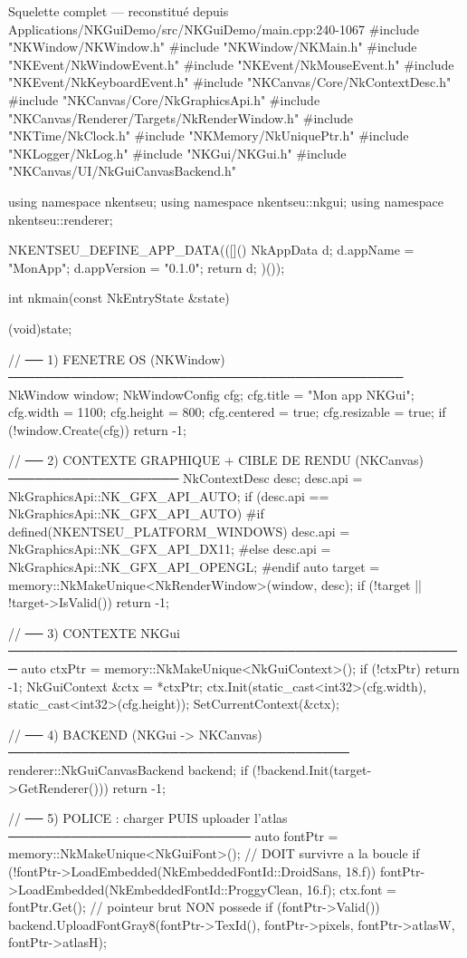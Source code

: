 \begin{nkcode}{Squelette complet — reconstitué depuis Applications/NKGuiDemo/src/NKGuiDemo/main.cpp:240-1067}
#include "NKWindow/NKWindow.h"
#include "NKWindow/NKMain.h"
#include "NKEvent/NkWindowEvent.h"
#include "NKEvent/NkMouseEvent.h"
#include "NKEvent/NkKeyboardEvent.h"
#include "NKCanvas/Core/NkContextDesc.h"
#include "NKCanvas/Core/NkGraphicsApi.h"
#include "NKCanvas/Renderer/Targets/NkRenderWindow.h"
#include "NKTime/NkClock.h"
#include "NKMemory/NkUniquePtr.h"
#include "NKLogger/NkLog.h"
#include "NKGui/NKGui.h"
#include "NKCanvas/UI/NkGuiCanvasBackend.h"

using namespace nkentseu;
using namespace nkentseu::nkgui;
using namespace nkentseu::renderer;

NKENTSEU_DEFINE_APP_DATA(([]() {
    NkAppData d{};
    d.appName    = "MonApp";
    d.appVersion = "0.1.0";
    return d;
})());

int nkmain(const NkEntryState &state) {
    (void)state;

    // ── 1) FENETRE OS (NKWindow) ────────────────────────────────────────────
    NkWindow window;
    NkWindowConfig cfg;
    cfg.title = "Mon app NKGui";
    cfg.width = 1100; cfg.height = 800;
    cfg.centered = true; cfg.resizable = true;
    if (!window.Create(cfg)) return -1;

    // ── 2) CONTEXTE GRAPHIQUE + CIBLE DE RENDU (NKCanvas) ───────────────────
    NkContextDesc desc;
    desc.api = NkGraphicsApi::NK_GFX_API_AUTO;
    if (desc.api == NkGraphicsApi::NK_GFX_API_AUTO) {
#if defined(NKENTSEU_PLATFORM_WINDOWS)
        desc.api = NkGraphicsApi::NK_GFX_API_DX11;
#else
        desc.api = NkGraphicsApi::NK_GFX_API_OPENGL;
#endif
    }
    auto target = memory::NkMakeUnique<NkRenderWindow>(window, desc);
    if (!target || !target->IsValid()) return -1;

    // ── 3) CONTEXTE NKGui ───────────────────────────────────────────────────
    auto ctxPtr = memory::NkMakeUnique<NkGuiContext>();
    if (!ctxPtr) return -1;
    NkGuiContext &ctx = *ctxPtr;
    ctx.Init(static_cast<int32>(cfg.width), static_cast<int32>(cfg.height));
    SetCurrentContext(&ctx);

    // ── 4) BACKEND (NKGui -> NKCanvas) ──────────────────────────────────────
    renderer::NkGuiCanvasBackend backend;
    if (!backend.Init(target->GetRenderer())) return -1;

    // ── 5) POLICE : charger PUIS uploader l'atlas ───────────────────────────
    auto fontPtr = memory::NkMakeUnique<NkGuiFont>();   // DOIT survivre a la boucle
    if (!fontPtr->LoadEmbedded(NkEmbeddedFontId::DroidSans, 18.f)) {
        fontPtr->LoadEmbedded(NkEmbeddedFontId::ProggyClean, 16.f);
    }
    ctx.font = fontPtr.Get();                            // pointeur brut NON possede
    if (fontPtr->Valid()) {
        backend.UploadFontGray8(fontPtr->TexId(), fontPtr->pixels, fontPtr->atlasW, fontPtr->atlasH);
    }

}
\end{nkcode}
